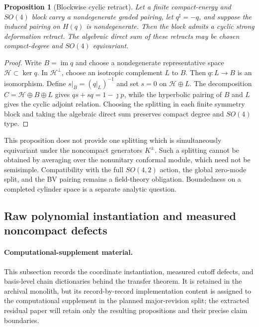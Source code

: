 \documentclass[11pt]{article}
\newtheorem{proposition}[theorem]{Proposition}
\theoremstyle{definition}
\theoremstyle{remark}
\newcommand{\cH}{\mathcal H}
\newcommand{\im}{\operatorname{im}}
\begin{document}
\begin{proposition}[Blockwise cyclic retract]\label{prop:cyclic-retract}
Let a finite compact-energy and $SO(4)$ block carry a nondegenerate graded
pairing, let $q^\sharp=-q$, and suppose the induced pairing on $H(q)$ is
nondegenerate.  Then the block admits a cyclic strong deformation retract.
The algebraic direct sum of these retracts may be chosen compact-degree and
$SO(4)$ equivariant.
\end{proposition}

\begin{proof}
Write $B=\im q$ and choose a nondegenerate representative space
$\cH\subset\ker q$.  In $\cH^\perp$, choose an isotropic complement $L$ to
$B$.  Then $q:L\to B$ is an isomorphism.  Define $s|_B=(q|_L)^{-1}$ and set
$s=0$ on $\cH\oplus L$.  The decomposition
$C=\cH\oplus B\oplus L$ gives $qs+sq=1-\jmath p$, while the hyperbolic
pairing of $B$ and $L$ gives the cyclic adjoint relation.  Choosing the
splitting in each finite symmetry block and taking the algebraic direct sum
preserves compact degree and $SO(4)$ type.
\end{proof}

This proposition does not provide one splitting which is simultaneously
equivariant under the noncompact generators $K^\pm$.  Such a splitting
cannot be obtained by averaging over the nonunitary conformal module, which
need not be semisimple.  Compatibility with the full $SO(4,2)$ action, the
global zero-mode split, and the BV pairing remains a field-theory
obligation.  Boundedness on a completed cylinder space is a separate
analytic question.

\subsection{Raw polynomial instantiation and measured noncompact defects}

\paragraph{Computational-supplement material.}
This subsection records the coordinate instantiation, measured cutoff
defects, and basis-level chain dictionaries behind the transfer theorem.  It
is retained in the archival monolith, but its record-by-record implementation
content is assigned to the computational supplement in the planned
major-revision split; the extracted residual paper will retain only the
resulting propositions and their precise claim boundaries.
\end{document}
